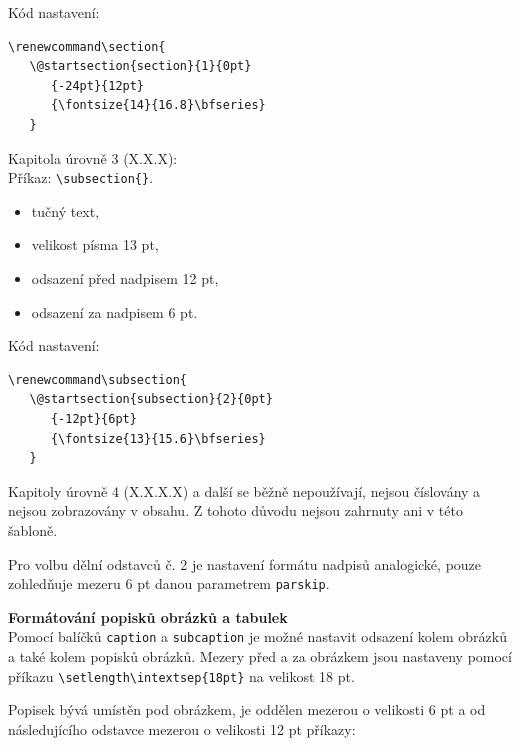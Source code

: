 Kód nastavení:

\begin{verbatim}
\renewcommand\section{
   \@startsection{section}{1}{0pt}
      {-24pt}{12pt}
      {\fontsize{14}{16.8}\bfseries}
   } 
\end{verbatim}

Kapitola úrovně 3 (X.X.X):\\
Příkaz: \verb|\subsection{}|.

\begin{itemize}[label=-]
	\item tučný text,
	\item velikost písma 13 pt,
	\item odsazení před nadpisem 12 pt,
	\item odsazení za nadpisem 6 pt.
\end{itemize}

Kód nastavení:

\begin{verbatim}
\renewcommand\subsection{
   \@startsection{subsection}{2}{0pt}
      {-12pt}{6pt}
      {\fontsize{13}{15.6}\bfseries}
   }
\end{verbatim}

Kapitoly úrovně 4 (X.X.X.X) a další se běžně nepoužívají, nejsou číslovány a nejsou zobrazovány v obsahu. Z tohoto důvodu nejsou zahrnuty ani v této šabloně.

Pro volbu dělní odstavců č. 2 je nastavení formátu nadpisů analogické, pouze zohledňuje mezeru 6 pt danou parametrem \verb|parskip|.

\vspace{8pt}
\textbf{Formátování popisků obrázků a tabulek}\\
Pomocí balíčků \verb|caption| a \verb|subcaption| je možné nastavit odsazení kolem obrázků a také kolem popisků obrázků. Mezery před a za obrázkem jsou nastaveny pomocí příkazu \verb|\setlength\intextsep{18pt}| na velikost 18 pt. 

Popisek bývá umístěn pod obrázkem, je oddělen mezerou o velikosti 6 pt a od následujícího odstavce mezerou o velikosti 12 pt příkazy: 

